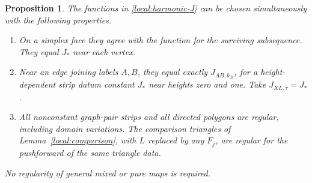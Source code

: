 \documentclass[11pt]{article}
\newtheorem{proposition}[theorem]{Proposition}
\theoremstyle{definition}
\theoremstyle{remark}
\numberwithin{equation}{section}
\begin{document}
\begin{proposition}\label{local:data}
The functions in \eqref{local:harmonic-J} can be chosen simultaneously
with the following properties.
\begin{enumerate}[label=(\roman*)]
\item On a simplex face they agree with the function for the surviving
subsequence.  They equal $J_*$ near each vertex.
\item Near an edge joining labels $A,B$, they equal exactly
$J_{AB,h_B}$, for a height-dependent strip datum constant $J_*$ near
heights zero and one.  Take $J_{XL,\tau}=J_*$.
\item All nonconstant graph-pair strips and all directed polygons are
regular, including domain variations.  The comparison triangles of
Lemma~\ref{local:comparison}, with $L$ replaced by any $F_j$, are regular
for the pushforward of the same triangle data.
\end{enumerate}
No regularity of general mixed or pure maps is required.
\end{proposition}
\end{document}
